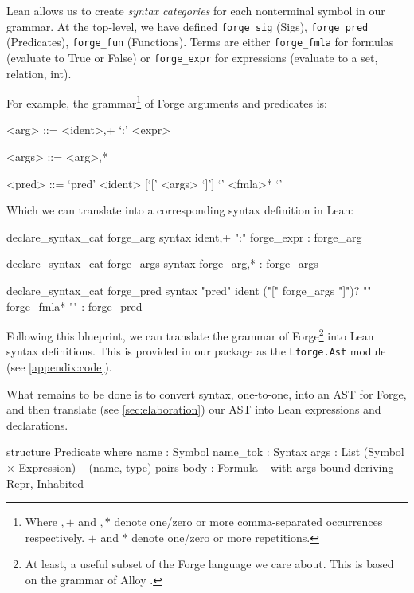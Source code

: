 Lean allows us to create \emph{syntax categories} for each nonterminal symbol in our grammar. At the top-level, we have defined \texttt{forge\_sig} (Sigs), \texttt{forge\_pred} (Predicates), \texttt{forge\_fun} (Functions). Terms are either \texttt{forge\_fmla} for formulas (evaluate to True or False) or \texttt{forge\_expr} for expressions (evaluate to a set, relation, int).

For example, the grammar\footnote{Where $,+$ and $,*$ denote one/zero or more comma-separated occurrences respectively. $+$ and $*$ denote one/zero or more repetitions.} of Forge arguments and predicates is:

\vspace{1em}\begin{center}
\begin{minipage}{0.8\textwidth}
\setlength{\grammarindent}{6em}
\begin{grammar}
<arg> ::= <ident>,+ `:' <expr>

<args> ::= <arg>,*

<pred> ::= `pred' <ident> [`[' <args> `]'] `{' <fmla>* `}'
\end{grammar}
\end{minipage}
\end{center}

Which we can translate into a corresponding syntax definition in Lean:
\begin{leanimpl*}
declare_syntax_cat forge_arg
syntax ident,+ ":" forge_expr : forge_arg

declare_syntax_cat forge_args
syntax forge_arg,* : forge_args

declare_syntax_cat forge_pred
syntax "pred" ident ("[" forge_args "]")? "{" forge_fmla* "}" : forge_pred
\end{leanimpl*}

Following this blueprint, we can translate the grammar of Forge\footnote{At least, a useful subset of the Forge language we care about. This is based on the grammar of Alloy \cite{jackson2012software,jackson2019alloy,ngpdbccdlrrvwwk-oopsla-2024}.} into Lean syntax definitions. This is provided in our package as the \texttt{Lforge.Ast} module (see \cref{appendix:code}).

What remains to be done is to convert syntax, one-to-one, into an AST for Forge, and then translate (see \cref{sec:elaboration}) our AST into Lean expressions and declarations.

\begin{leanimpl*}
structure Predicate where
  name : Symbol
  name_tok : Syntax
  args : List (Symbol × Expression) -- (name, type) pairs
  body : Formula -- with args bound
  deriving Repr, Inhabited   
\end{leanimpl*}

